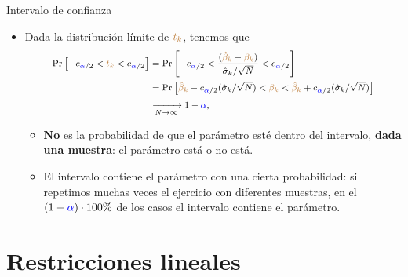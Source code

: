 \documentclass[10pt, xcolor=dvipsnames]{beamer}
\begin{document}
\begin{frame}{Intervalo de confianza}
\begin{itemize}
	\item Dada la distribución límite de $\textcolor{brown}{t_k}$, tenemos que	
\begin{align*}
	\fontvid
\begin{split}
    \Prob{-c_{\textcolor{blue}{\alpha}/2}<\textcolor{brown}{t_k}< c_{\textcolor{blue}{\alpha}/2}} 
    &= \Prob{-c_{\textcolor{blue}{\alpha}/2}<\frac{(\textcolor{brown}{\hat{\beta}_k}-\textcolor{brown}{\beta_k})}{\hat{\sigma}_k/\sqrt{N}}< c_{\textcolor{blue}{\alpha}/2}} \\
    &= \Prob{\brown{\hat{\beta}_k}-c_{\textcolor{blue}{\alpha}/2}(\hat{\sigma}_k/\sqrt{N}) < \brown{\beta_k} < \brown{\hat{\beta}_k} + c_{\textcolor{blue}{\alpha}/2}(\hat{\sigma}_k/\sqrt{N})} \\ &\xrightarrow[N \to \infty]{} 1-\textcolor{blue}{\alpha},
\end{split}
\end{align*}	
    \begin{itemize}
        \item \textbf{No} es la probabilidad de que el parámetro esté dentro del intervalo, \textbf{dada una muestra}: el parámetro está o no está. \smallspace 
        \item El intervalo contiene el parámetro con una cierta probabilidad: si repetimos muchas veces el ejercicio con diferentes muestras, en el $(1-\textcolor{blue}{\alpha})\cdot 100\%$ de los casos el intervalo contiene el parámetro.
    \end{itemize}
\end{itemize}	
\end{frame}


\section{Restricciones lineales}
\end{document}
